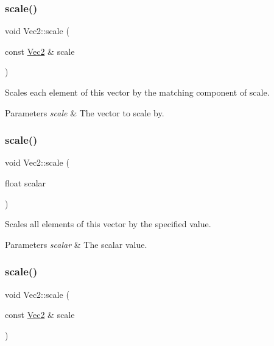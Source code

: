 \subsubsection{\texorpdfstring{scale()}{scale()}\hspace{0.1cm}{\footnotesize\ttfamily [2/4]}}
{\footnotesize\ttfamily void Vec2\+::scale (\begin{DoxyParamCaption}\item[{const \hyperlink{classVec2}{Vec2} \&}]{scale }\end{DoxyParamCaption})\hspace{0.3cm}{\ttfamily [inline]}}

Scales each element of this vector by the matching component of scale.


\begin{DoxyParams}{Parameters}
{\em scale} & The vector to scale by. \\
\hline
\end{DoxyParams}
\mbox{\label{classVec2_a67d98d1e2261ae9369bd79c337187cd8}} 
\subsubsection{\texorpdfstring{scale()}{scale()}\hspace{0.1cm}{\footnotesize\ttfamily [3/4]}}
{\footnotesize\ttfamily void Vec2\+::scale (\begin{DoxyParamCaption}\item[{float}]{scalar }\end{DoxyParamCaption})\hspace{0.3cm}{\ttfamily [inline]}}

Scales all elements of this vector by the specified value.


\begin{DoxyParams}{Parameters}
{\em scalar} & The scalar value. \\
\hline
\end{DoxyParams}
\mbox{\label{classVec2_ae2c74b30190869c962302065cfeecf8c}} 
\subsubsection{\texorpdfstring{scale()}{scale()}\hspace{0.1cm}{\footnotesize\ttfamily [4/4]}}
{\footnotesize\ttfamily void Vec2\+::scale (\begin{DoxyParamCaption}\item[{const \hyperlink{classVec2}{Vec2} \&}]{scale }\end{DoxyParamCaption})\hspace{0.3cm}{\ttfamily [inline]}}

